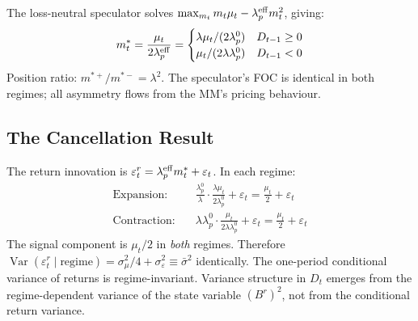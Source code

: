 \documentclass[12pt,a4paper]{article}
\theoremstyle{definition}
\begin{document}
The loss-neutral speculator solves $\max_{m_t} m_t\mu_t -
\lambda^{\rm eff}_p m^2_t$, giving:
\begin{equation}
  m^*_t = \frac{\mu_t}{2\lambda^{\rm eff}_p}
  = \begin{cases}
      \lambda\mu_t/(2\lambda^0_p) & D_{t-1} \geq 0 \\
      \mu_t/(2\lambda\lambda^0_p) & D_{t-1} < 0
    \end{cases}
  \label{eq:optimal_position}
\end{equation}
Position ratio: $m^{*+}/m^{*-} = \lambda^2$. The speculator's
FOC is identical in both regimes; all asymmetry flows from the MM's
pricing behaviour.

\subsection{The Cancellation Result}
\label{sec:cancellation}

The return innovation is $\varepsilon^r_t = \lambda^{\rm eff}_p m^*_t +
\varepsilon_t$. In each regime:
\begin{align*}
  \text{Expansion:} &\quad
    \frac{\lambda^0_p}{\lambda} \cdot \frac{\lambda\mu_t}{2\lambda^0_p}
    + \varepsilon_t = \frac{\mu_t}{2} + \varepsilon_t \\
  \text{Contraction:} &\quad
    \lambda\lambda^0_p \cdot \frac{\mu_t}{2\lambda\lambda^0_p}
    + \varepsilon_t = \frac{\mu_t}{2} + \varepsilon_t
\end{align*}
The signal component is $\mu_t/2$ in \emph{both} regimes. Therefore
$\operatorname{Var}(\varepsilon^r_t \mid \text{regime}) = \sigma^2_\mu/4 +
\sigma^2_\varepsilon \equiv \bar\sigma^2$ identically. The one-period
conditional variance of returns is regime-invariant. Variance structure in
$D_t$ emerges from the regime-dependent variance of the state variable
$(B^r)^2$, not from the conditional return variance.
\end{document}
